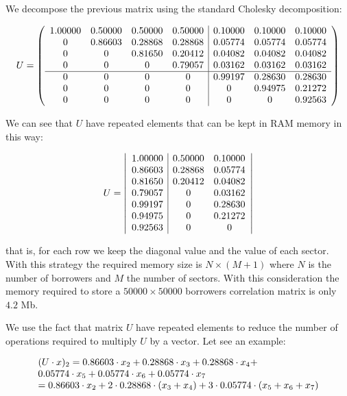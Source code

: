 \documentclass[a4paper,12pt,final]{article}
\begin{document}
We decompose the previous matrix using the standard Cholesky decomposition:

\begin{displaymath}
U = \left(
\begin{array}{cccc|ccc}
 1.00000 & 0.50000 & 0.50000 & 0.50000 & 0.10000 & 0.10000 & 0.10000 \cr
 0       & 0.86603 & 0.28868 & 0.28868 & 0.05774 & 0.05774 & 0.05774 \cr
 0       & 0       & 0.81650 & 0.20412 & 0.04082 & 0.04082 & 0.04082 \cr
 0       & 0       & 0       & 0.79057 & 0.03162 & 0.03162 & 0.03162 \cr
\hline
 0       & 0       & 0       & 0       & 0.99197 & 0.28630 & 0.28630 \cr
 0       & 0       & 0       & 0       & 0       & 0.94975 & 0.21272 \cr
 0       & 0       & 0       & 0       & 0       & 0       & 0.92563
\end{array}
\right)
\end{displaymath}

We can see that $U$ have repeated elements that can be kept in RAM memory in 
this way:

\begin{displaymath}
U = \left|
\begin{array}{c|cc}
 1.00000 & 0.50000 & 0.10000 \cr
 0.86603 & 0.28868 & 0.05774 \cr
 0.81650 & 0.20412 & 0.04082 \cr
 0.79057 & 0       & 0.03162 \cr
 0.99197 & 0       & 0.28630 \cr
 0.94975 & 0       & 0.21272 \cr
 0.92563 & 0       & 0
\end{array}
\right|
\end{displaymath}

that is, for each row we keep the diagonal value and the value of each sector. 
With this strategy the required memory size is $N \times (M+1)$ where $N$ is
the number of borrowers and $M$ the number of sectors. With this consideration
the memory required to store a $50000 \times 50000$ borrowers correlation matrix
is only $4.2$ Mb.
\newline

We use the fact that matrix $U$ have repeated elements to reduce the number of 
operations required to multiply $U$ by a vector. Let see an example:

\begin{displaymath}
\begin{array}{l}
(U \cdot x)_2 =  0.86603 \cdot x_2 + 0.28868 \cdot x_3 + 0.28868 \cdot x_4 + \cr
                 0.05774 \cdot x_5 + 0.05774 \cdot x_6 + 0.05774 \cdot x_7 \cr
              = 0.86603 \cdot x_2 + 2\cdot 0.28868 \cdot (x_3 + x_4) + 3 \cdot 0.05774 \cdot (x_5 + x_6 + x_7)
\end{array}
\end{displaymath}
\end{document}
